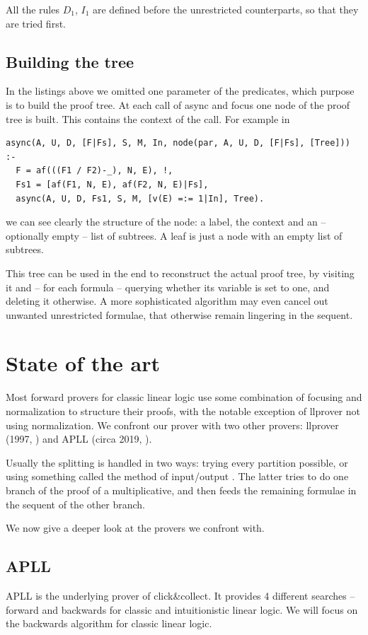 \documentclass[a4paper, 12pt, tesi, english]{report}
\begin{document}
All the rules $D_1$, $I_1$ are defined before the unrestricted counterparts, so that they are tried first.


\section{Building the tree}
In the listings above we omitted one parameter of the predicates, which purpose is to build the proof tree.
At each call of async and focus one node of the proof tree is built.
This contains the context of the call.
For example in
\begin{verbatim}
async(A, U, D, [F|Fs], S, M, In, node(par, A, U, D, [F|Fs], [Tree])) :- 
  F = af(((F1 / F2)-_), N, E), !,
  Fs1 = [af(F1, N, E), af(F2, N, E)|Fs],
  async(A, U, D, Fs1, S, M, [v(E) =:= 1|In], Tree).
\end{verbatim}
we can see clearly the structure of the node: a label, the context and an -- optionally empty -- list of subtrees.
A leaf is just a node with an empty list of subtrees.

This tree can be used in the end to reconstruct the actual proof tree, by visiting it and -- for each formula -- querying whether its variable is set to one, and deleting it otherwise.
A more sophisticated algorithm may even cancel out unwanted unrestricted formulae, that otherwise remain lingering in the sequent.

\chapter{State of the art}
Most forward provers for classic linear logic use some combination of focusing and normalization to structure their proofs, with the notable exception of llprover not using normalization.	%
We confront our prover with two other provers: llprover (1997, %
) and APLL (circa 2019, %
).

Usually the splitting is handled in two ways: trying every partition possible, or using something called the method of input/output %
. The latter tries to do one branch of the proof of a multiplicative, and then feeds the remaining formulae in the sequent of the other branch.

We now give a deeper look at the provers we confront with.

\section{APLL}\label{sec:apll}
APLL is the underlying prover of click\&collect. %
It provides 4 different searches -- forward and backwards for classic and intuitionistic linear logic. 
We will focus on the backwards algorithm for classic linear logic.
\end{document}
